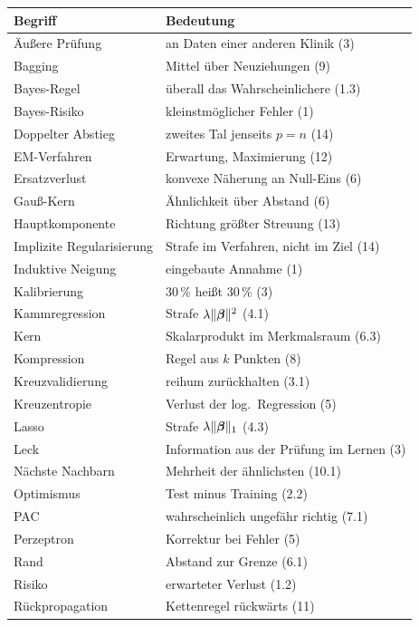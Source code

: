 \begin{merksatz}
\begin{center}
{\small
\renewcommand{\arraystretch}{1.3}
\begin{longtable}{@{}P{3.6cm}P{5.0cm}@{}}
\toprule
\textbf{Begriff} & \textbf{Bedeutung}\\
\midrule
\endhead
Äußere Prüfung & an Daten einer anderen Klinik (3)\\
Bagging & Mittel über Neuziehungen (9)\\
Bayes-Regel & überall das Wahrscheinlichere (1.3)\\
Bayes-Risiko & kleinstmöglicher Fehler (1)\\
Doppelter Abstieg & zweites Tal jenseits $p = n$ (14)\\
EM-Verfahren & Erwartung, Maximierung (12)\\
Ersatzverlust & konvexe Näherung an Null-Eins (6)\\
Gauß-Kern & Ähnlichkeit über Abstand (6)\\
Hauptkomponente & Richtung größter Streuung (13)\\
Implizite Regularisierung & Strafe im Verfahren, nicht im Ziel (14)\\
Induktive Neigung & eingebaute Annahme (1)\\
Kalibrierung & $30\,\%$ heißt $30\,\%$ (3)\\
Kammregression & Strafe $\lambda\|\boldsymbol{\beta}\|^{2}$ (4.1)\\
Kern & Skalarprodukt im Merkmalsraum (6.3)\\
Kompression & Regel aus $k$ Punkten (8)\\
Kreuzvalidierung & reihum zurückhalten (3.1)\\
Kreuzentropie & Verlust der log.\ Regression (5)\\
Lasso & Strafe $\lambda\|\boldsymbol{\beta}\|_1$ (4.3)\\
Leck & Information aus der Prüfung im Lernen (3)\\
Nächste Nachbarn & Mehrheit der ähnlichsten (10.1)\\
Optimismus & Test minus Training (2.2)\\
PAC & wahrscheinlich ungefähr richtig (7.1)\\
Perzeptron & Korrektur bei Fehler (5)\\
Rand & Abstand zur Grenze (6.1)\\
Risiko & erwarteter Verlust (1.2)\\
Rückpropagation & Kettenregel rückwärts (11)\\

\end{longtable}}
\end{center}
\end{merksatz}
